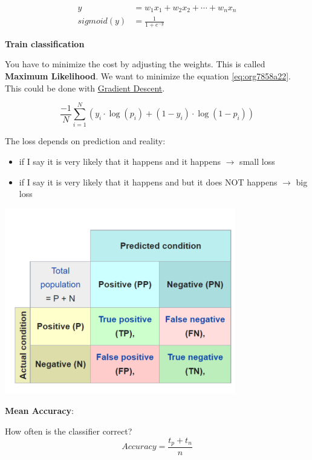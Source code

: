 \documentclass[11pt,twoside,landscape]{article}
\begin{document}
\begin{multicols}{3}
\begin{align}
  y &= w_1x_1 + w_2x_2 + \cdots + w_nx_n \\
  sigmoid(y) &= \frac{1}{1 + e^{-y}}
\end{align}


\textbf{Train classification}

You have to minimize the cost by adjusting the weights.
This is called \textbf{Maximum Likelihood}.
We want to minimize the equation \ref{eq:org7858a22}.
This could be done with \href{../../../roam/20211208163604-gradient_descent.org}{Gradient Descent}.

\begin{equation}
\label{eq:org7858a22}
  \frac{-1}{N}\sum_{i=1}^{N}(y_i \cdot \log(p_i) + (1 - y_i)\cdot \log(1-p_i))
\end{equation}

The loss depends on prediction and reality:
\begin{itemize}
\item if I say it is very likely that it happens and it happens \(\rightarrow\) small loss
\item if I say it is very likely that it happens and but it does NOT happens \(\rightarrow\) big loss
\end{itemize}

\begin{center}
\includegraphics[width=.9\linewidth]{img/confusion_matrix.png}
\end{center}


\textbf{Mean Accuracy}:

How often is the classifier correct?
\begin{equation}
Accuracy = \frac{t_p + t_n}{n}
\end{equation}


\end{multicols}
\end{document}
